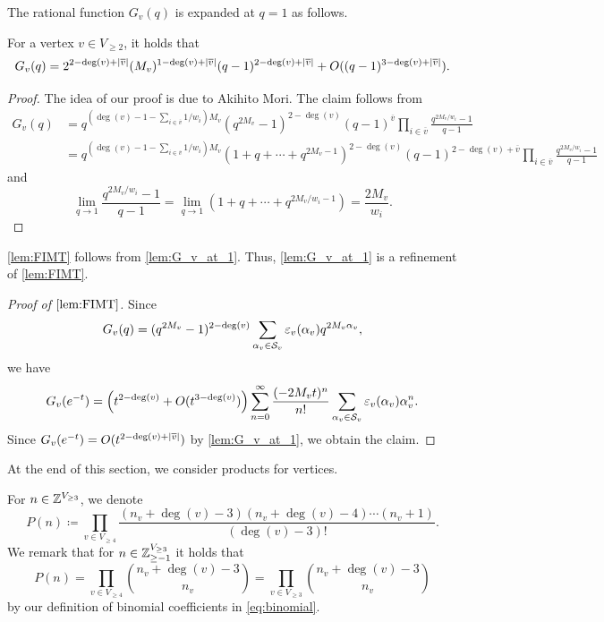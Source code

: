 \documentclass[11pt,a4paper,lualatex]{amsart}
\numberwithin{equation}{section} %
\begin{document}
The rational function $ G_v (q) $ is expanded at $ q=1 $ as follows. 

\begin{lem} \label{lem:G_v_at_1}
	For a vertex $ v \in V_{\ge 2} $, it holds that
	\[
	G_v(q) = 2^{2 - \deg(v) + \left\lvert\overline{v}\right\rvert} (M_v)^{1 - \deg(v) + \left\lvert\overline{v}\right\rvert} (q-1)^{2 - \deg(v) + \left\lvert\overline{v}\right\rvert}
	+O((q-1)^{3 - \deg(v) + \left\lvert\overline{v}\right\rvert}).
	\]
\end{lem}

\begin{proof}
	The idea of our proof is due to Akihito Mori.
	The claim follows from
	\begin{align}
		G_v(q)
		&= q^{(\deg(v) - 1 - \sum_{i \in \overline{v}} 1/w_i) M_v} 
		(q^{2M_{v}} - 1)^{2 - \deg(v)} (q-1)^{\overline{v}}
		\prod_{i \in \overline{v}} \frac{q^{2M_{v} / w_{i}} - 1}{q-1} \\
		&= q^{(\deg(v) - 1 - \sum_{i \in \overline{v}} 1/w_i) M_v}
		(1 + q + \cdots + q^{2M_v - 1})^{2 - \deg(v)} (q-1)^{2 - \deg(v) + \overline{v}} 
		\prod_{i \in \overline{v}} \frac{q^{2M_{v} / w_{i}} - 1}{q-1}
	\end{align}
	and
	\[
	\lim_{q \to 1} \frac{q^{2M_{v} / w_{i}} - 1}{q-1}
	= \lim_{q \to 1} \left( 1 + q + \cdots + q^{2M_v / w_i - 1} \right)
	= \frac{2M_{v}}{w_i}.
	\]
\end{proof}

\cref{lem:FIMT} follows from \cref{lem:G_v_at_1}.
Thus, \cref{lem:G_v_at_1} is a refinement of \cref{lem:FIMT}. 

\begin{proof}[Proof of $ \cref{lem:FIMT} $]
	Since
	\[
	G_{v} (q)
	=
	(q^{2M_{v}} - 1)^{2 - \deg(v)}
	\sum_{\alpha_{v} \in \mathcal{S}_{v}} \varepsilon_{v}(\alpha_{v}) q^{2M_{v} \alpha_{v}},
	\]
	we have
	\[
	G_{v} (e^{-t})
	=
	\left( t^{2 - \deg(v)} + O(t^{3 - \deg(v)}) \right) 
	\sum_{n = 0}^{\infty} \frac{(-2M_v t)^{n}}{n!}
	\sum_{\alpha_{v} \in \mathcal{S}_{v}} \varepsilon_{v}(\alpha_{v}) \alpha_v^n.
	\]
	Since $ G_{v} (e^{-t}) = O(t^{2 - \deg(v) + \left\lvert\overline{v}\right\rvert}) $ by \cref{lem:G_v_at_1}, we obtain the claim. 
\end{proof}

At the end of this section, we consider products for vertices.

For $ n \in \mathbb{Z}^{V_{\ge 3}} $, we denote
\begin{equation} \label{eq:prod_vertices}
	P(n) \coloneqq \prod_{v \in V_{\ge 4}} \frac{(n_{v} + \deg(v) - 3)(n_{v} + \deg(v) - 4) \cdots (n_v +1)}{(\deg(v) - 3)!}.
\end{equation}
We remark that for $ n \in \mathbb{Z}_{\ge -1}^{V_{\ge 3}} $ it holds that
\[
P(n) = \prod_{v \in V_{\ge 4}} \binom{n_{v} + \deg(v) - 3}{n_{v}}
= \prod_{v \in V_{\ge 3}} \binom{n_{v} + \deg(v) - 3}{n_{v}}
\]
by our definition of binomial coefficients in \cref{eq:binomial}.
\end{document}
